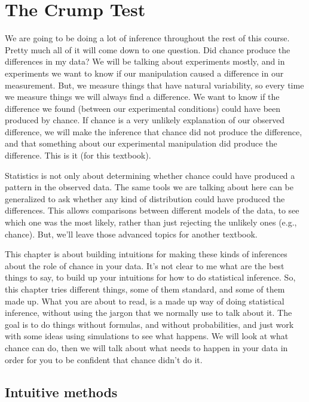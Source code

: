\documentclass[
]{book}
\begin{document}
\section{The Crump Test}\label{the-crump-test}

We are going to be doing a lot of inference throughout the rest of this course. Pretty much all of it will come down to one question. Did chance produce the differences in my data? We will be talking about experiments mostly, and in experiments we want to know if our manipulation caused a difference in our measurement. But, we measure things that have natural variability, so every time we measure things we will always find a difference. We want to know if the difference we found (between our experimental conditions) could have been produced by chance. If chance is a very unlikely explanation of our observed difference, we will make the inference that chance did not produce the difference, and that something about our experimental manipulation did produce the difference. This is it (for this textbook).

Statistics is not only about determining whether chance could have produced a pattern in the observed data. The same tools we are talking about here can be generalized to ask whether any kind of distribution could have produced the differences. This allows comparisons between different models of the data, to see which one was the most likely, rather than just rejecting the unlikely ones (e.g., chance). But, we'll leave those advanced topics for another textbook.

This chapter is about building intuitions for making these kinds of inferences about the role of chance in your data. It's not clear to me what are the best things to say, to build up your intuitions for how to do statistical inference. So, this chapter tries different things, some of them standard, and some of them made up. What you are about to read, is a made up way of doing statistical inference, without using the jargon that we normally use to talk about it. The goal is to do things without formulas, and without probabilities, and just work with some ideas using simulations to see what happens. We will look at what chance can do, then we will talk about what needs to happen in your data in order for you to be confident that chance didn't do it.

\subsection{Intuitive methods}\label{intuitive-methods}
\end{document}
